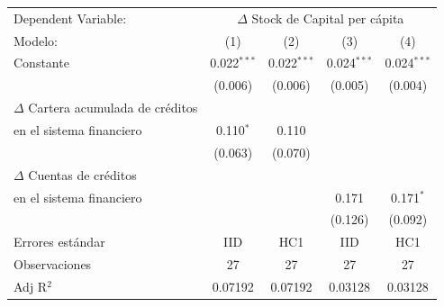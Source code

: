 \begingroup
\centering
\begin{tabular}{lcccc}
   \tabularnewline \midrule \midrule
   Dependent Variable: & \multicolumn{4}{c}{$\Delta$ Stock de Capital per cápita}\\
   Modelo:                                                                & (1)           & (2)                       & (3)           & (4)\\  
   \midrule
 
   Constante                                                              & 0.022$^{***}$ & 0.022$^{***}$             & 0.024$^{***}$ & 0.024$^{***}$\\   
                                                                         & (0.006)       & (0.006)                   & (0.005)       & (0.004)\\   
   $\Delta$ Cartera acumulada de créditos \\ en el sistema financiero    & 0.110$^{*}$   & 0.110                     &               &   \\   
                                                                         & (0.063)       & (0.070)                   &               &   \\   
   $\Delta$ Cuentas de créditos \\ en el sistema financiero              &               &                           & 0.171         & 0.171$^{*}$\\   
                                                                         &               &                           & (0.126)       & (0.092)\\   
   \midrule
   Errores estándar                                                       & IID           & HC1 & IID           & HC1 \\   
   Observaciones                                                          & 27            & 27                        & 27            & 27\\  
   Adj R$^2$                                                        & 0.07192       & 0.07192                   & 0.03128       & 0.03128\\  
   \midrule \midrule
\end{tabular}
\par\endgroup
